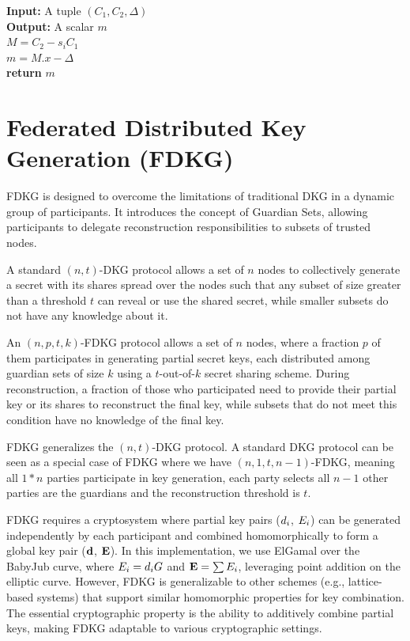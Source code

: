 \documentclass[lettersize,journal]{IEEEtran}
\theoremstyle{definition}
\begin{document}
\begin{algorithm}[h!]
    \caption{$\texttt{Dec}_{s_i}$}
    \label{alg:decryption}
    \textbf{Input:} A tuple $(C_1, C_2, \Delta)$\\
    \textbf{Output:} A scalar $m$\\
    $M = C_2 - s_i C_1$\\
    $m = M.x - \Delta$\\
    \textbf{return} $m$
\end{algorithm}



\section{Federated Distributed Key Generation (FDKG)}\label{sec:fdkg}
FDKG is designed to overcome the limitations of traditional DKG in a dynamic group of participants. It introduces the concept of Guardian Sets, allowing participants to delegate reconstruction responsibilities to subsets of trusted nodes.

A standard $(n, t)$-DKG protocol allows a set of $n$ nodes to collectively generate a secret with its shares spread over the nodes such that any subset of size greater than a threshold $t$ can reveal or use the shared secret, while smaller subsets do not have any knowledge about it.

An $(n, p, t, k)$-FDKG protocol allows a set of $n$ nodes, where a fraction $p$ of them participates in generating partial secret keys, each distributed among guardian sets of size $k$ using a $t$-out-of-$k$ secret sharing scheme. During reconstruction, a fraction of those who participated need to provide their partial key or its shares to reconstruct the final key, while subsets that do not meet this condition have no knowledge of the final key.

FDKG generalizes the $(n, t)$-DKG protocol. A standard DKG protocol can be seen as a special case of FDKG where we have $(n, 1, t, n-1)$-FDKG, meaning all $1 * n$ parties participate in key generation, each party selects all $n-1$ other parties are the guardians and the reconstruction threshold is $t$.

FDKG requires a cryptosystem where partial key pairs (\(d_{i}\), \(E_{i}\)) can be generated independently by each participant and combined homomorphically to form a global key pair (\(\textbf{d}\), \(\textbf{E}\)). In this implementation, we use ElGamal over the BabyJub curve, where \(E_{i} = d_{i} G\) and \(\textbf{E} = \sum E_{i}\), leveraging point addition on the elliptic curve. However, FDKG is generalizable to other schemes (e.g., lattice-based systems) that support similar homomorphic properties for key combination. The essential cryptographic property is the ability to additively combine partial keys, making FDKG adaptable to various cryptographic settings.
\end{document}
